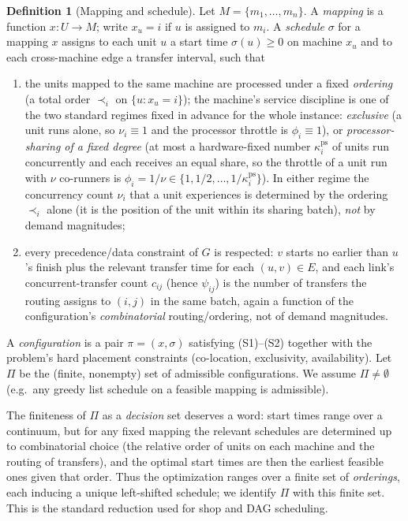 \documentclass{amsart}
\theoremstyle{definition}
\newtheorem{definition}{Definition}
\begin{document}
\begin{definition}[Mapping and schedule]\label{def:sched}
Let $M=\{m_1,\dots,m_n\}$. A \emph{mapping} is a function $x\colon U\to M$;
write $x_u=i$ if $u$ is assigned to $m_i$. A \emph{schedule} $\sigma$ for a
mapping $x$ assigns to each unit $u$ a start time $\sigma(u)\ge0$ on machine
$x_u$ and to each cross-machine edge a transfer interval, such that
\begin{enumerate}
\item[(S1)] the units mapped to the same machine are processed under a fixed
\emph{ordering} (a total order $\prec_i$ on $\{u:x_u=i\}$); the machine's
service discipline is one of the two standard regimes fixed in advance for the
whole instance: \emph{exclusive} (a unit runs alone, so $\nu_i\equiv1$ and the
processor throttle is $\phi_i\equiv1$), or \emph{processor-sharing of a fixed
degree} (at most a hardware-fixed number $\kappa^{\mathrm{ps}}_i$ of units run
concurrently and each receives an equal share, so the throttle of a unit run
with $\nu$ co-runners is $\phi_i=1/\nu\in\{1,1/2,\dots,1/\kappa^{\mathrm{ps}}_i\}$).
In either regime the concurrency count $\nu_i$ that a unit experiences is
determined by the ordering $\prec_i$ alone (it is the position of the unit within
its sharing batch), \emph{not} by demand magnitudes;
\item[(S2)] every precedence/data constraint of $G$ is respected: $v$ starts no
earlier than $u$'s finish plus the relevant transfer time for each $(u,v)\in E$,
and each link's concurrent-transfer count $c_{ij}$ (hence $\psi_{ij}$) is the
number of transfers the routing assigns to $(i,j)$ in the same batch, again a
function of the configuration's \emph{combinatorial} routing/ordering, not of
demand magnitudes.
\end{enumerate}
A \emph{configuration} is a pair $\pi=(x,\sigma)$ satisfying (S1)--(S2) together
with the problem's hard placement constraints (co-location, exclusivity,
availability). Let $\Pi$ be the (finite, nonempty) set of admissible
configurations. We assume $\Pi\neq\emptyset$ (e.g.\ any greedy list schedule on
a feasible mapping is admissible).
\end{definition}

The finiteness of $\Pi$ as a \emph{decision} set deserves a word: start times
range over a continuum, but for any fixed mapping the relevant schedules are
determined up to combinatorial choice (the relative order of units on each
machine and the routing of transfers), and the optimal start times are then the
earliest feasible ones given that order. Thus the optimization ranges over a
finite set of \emph{orderings}, each inducing a unique left-shifted schedule;
we identify $\Pi$ with this finite set. This is the standard reduction used for
shop and DAG scheduling.
\end{document}

